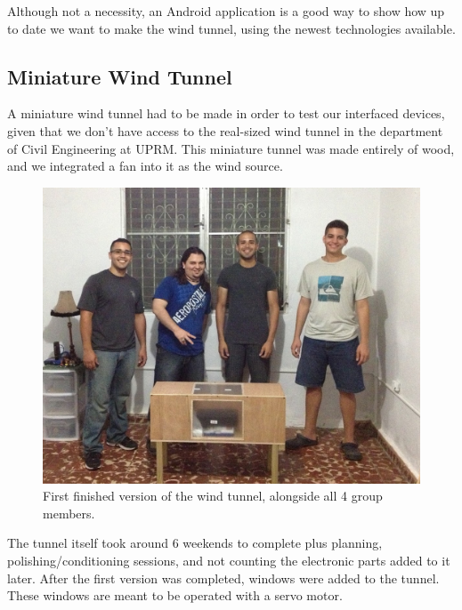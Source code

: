 		Although not a necessity, an Android application is a good way to show how up to date we want to make the wind tunnel, using the newest technologies available. 
		
		\subsection{Miniature Wind Tunnel}
		
		A miniature wind tunnel had to be made in order to test our interfaced devices, given that we don't have access to the real-sized wind tunnel in the department of Civil Engineering at UPRM. This miniature tunnel was made entirely of wood, and we integrated a fan into it as the wind source. 
		
		\begin{figure}[H]
			\centering
				\includegraphics[scale=0.3]{img/GroupPhoto}
			\caption{First finished version of the wind tunnel, alongside all 4 group members.}
		\end{figure}
		
		The tunnel itself took around 6 weekends to complete plus planning, polishing/conditioning sessions, and not counting the electronic parts added to it later. After the first version was completed, windows were added to the tunnel. These windows are meant to be operated with a servo motor. 
		
